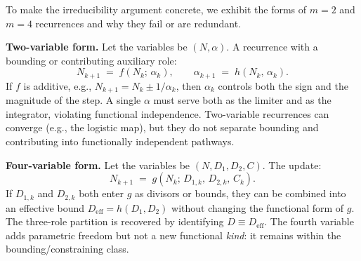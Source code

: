 \documentclass[12pt]{article}
\theoremstyle{definition}
\theoremstyle{remark}
\begin{document}
To make the irreducibility argument concrete, we exhibit the forms of $m = 2$ and
$m = 4$ recurrences and why they fail or are redundant.

\textbf{Two-variable form.}  Let the variables be $(N, \alpha)$.  A recurrence with a
bounding or contributing auxiliary role:
\[
  N_{k+1} \;=\; f(N_k;\,\alpha_k), \qquad \alpha_{k+1} \;=\; h(N_k,\,\alpha_k).
\]
If $f$ is additive, e.g., $N_{k+1} = N_k \pm 1/\alpha_k$, then $\alpha_k$ controls
both the sign and the magnitude of the step.  A single $\alpha$ must serve both as the
limiter and as the integrator, violating functional independence.  Two-variable
recurrences can converge (e.g., the logistic map), but they do not separate bounding
and contributing into functionally independent pathways.

\textbf{Four-variable form.}  Let the variables be $(N, D_1, D_2, C)$.  The update:
\[
  N_{k+1} \;=\; g(N_k;\,D_{1,k},\,D_{2,k},\,C_k).
\]
If $D_{1,k}$ and $D_{2,k}$ both enter $g$ as divisors or bounds, they can be combined
into an effective bound $D_{\mathrm{eff}} = h(D_1, D_2)$ without changing the
functional form of $g$.  The three-role partition is recovered by identifying
$D \equiv D_{\mathrm{eff}}$.  The fourth variable adds parametric freedom but not a new
functional \emph{kind}: it remains within the bounding/constraining class.
\end{document}
